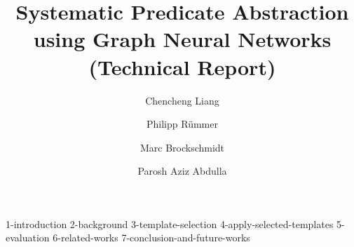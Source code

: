 \documentclass[runningheads]{llncs}
\begin{document}
%
\title{Systematic Predicate Abstraction using Graph Neural Networks (Technical Report)}
%
%


\author{Chencheng Liang%
\and
Philipp Rümmer%
\and
Marc Brockschmidt%
\and
Parosh Aziz Abdulla
}
%
%




%
\maketitle              %
%


{1-introduction}
{2-background}
{3-template-selection}
{4-apply-selected-templates}
{5-evaluation}
{6-related-works}
{7-conclusion-and-future-works}




\end{document}
